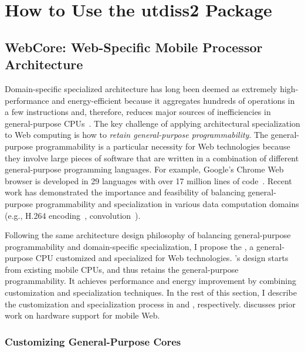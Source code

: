 \chapter{How to Use the utdiss2 Package}
%

\section{WebCore: Web-Specific Mobile Processor Architecture}
\label{sec:arch}

Domain-specific specialized architecture has long been deemed as extremely high-performance and energy-efficient because it aggregates hundreds of operations in a few instructions and, therefore, reduces major sources of inefficiencies in general-purpose CPUs~\cite{h264, soda, anysp}. The key challenge of applying architectural specialization to Web computing is how to \textit{retain general-purpose programmability}. The general-purpose programmability is a particular necessity for Web technologies because they involve large pieces of software that are written in a combination of different general-purpose programming languages. For example, Google's Chrome Web browser is developed in 29 languages with over 17 million lines of code~\cite{chromeloc}. Recent work has demonstrated the importance and feasibility of balancing general-purpose programmability and specialization in various data computation domains (e.g., H.264 encoding~\cite{h264}, convolution~\cite{ce}).

Following the same architecture design philosophy of balancing general-purpose programmability and domain-specific specialization, I propose the \webcore, a general-purpose CPU customized and specialized for Web technologies. \webcore's design starts from existing mobile CPUs, and thus retains the general-purpose programmability. It achieves performance and energy improvement by combining customization and specialization techniques. In the rest of this section, I describe the customization and specialization process in  and , respectively.  discusses prior work on hardware support for mobile Web.

\subsection{Customizing General-Purpose Cores}
\label{sec:arch:customization}

